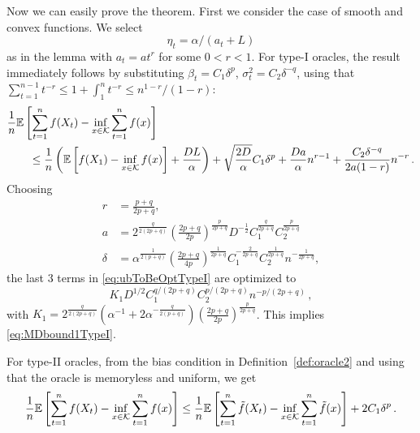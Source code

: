 Now we can easily prove the theorem.
First we consider the case of smooth and convex functions. We select $$\eta_t = \alpha/(a_t+L)$$ as in the lemma with 
$a_t=a t^r$ for some $0<r<1$. For type-I oracles, the result immediately follows by substituting $\beta_t = C_1\delta^p$, $\sigma^2_t = C_2 \delta^{-q}$, using that $\sum_{t=1}^{n-1} t^{-r} \le 1 +\int_1^n t^{-r} \le n^{1-r}/(1-r)$:
\begin{align}
\MoveEqLeft
\frac{1}{n} \EE{ \sum_{t=1}^n f( X_t) - \inf_{x \in \cK} \sum_{t=1}^n f(x)} \nonumber \\
&\le \frac{1}{n}\left(\EE{f(X_1)-\inf_{x \in \cK}f(x)}+\frac{DL}{\alpha}  \right) +\sqrt{\dfrac{2D}{\alpha}} C_1\delta^p
+\frac{Da}{\alpha} n^{r-1}+\dfrac{C_2 \delta^{-q}}{2a(1-r)}n^{-r} \,.
\label{eq:ubToBeOptTypeI}
 \end{align}
 Choosing 
 \begin{align*}
 r &= \tfrac{p+q}{2p+q},  \\
 a &= 2^{\frac{q}{2(2p+q)}}\left(\tfrac{2p+q}{2p}\right)^{\frac{p}{2p+q}} D^{-\frac{1}{2}} C_1^{\frac{q}{2p+q}} C_2^{\frac{p}{2p+q}} \\
 \delta &= \alpha^{\frac{1}{2(p+q)}}\left(\tfrac{2p+q}{4p}\right)^{\frac{1}{2p+q}} C_1^{-\frac{2}{2p+q}} C_2^{\frac{1}{2p+q}}n^{-\frac{1}{2p+q}},
 \end{align*}
the last $3$ terms in \eqref{eq:ubToBeOptTypeI} are optimized to
 \[
 K_1 D^{1/2} C_1^{q/(2p+q)} C_2^{p/(2p+q)} n ^{-p/(2p+q)} \,,
 \]
 with
 $K_1 = 2^{\frac{q}{2(2p+q)}} \left( \alpha^{-1}+2\alpha^{-\frac{q}{2(p+q)}} \right) \left( \frac{2p+q}{2p} \right)^{\frac{p}{2p+q}}$. This implies \eqref{eq:MDbound1TypeI}.

For type-II oracles, from the bias condition in Definition~\ref{def:oracle2} and using that the oracle is memoryless and uniform, we get
\begin{align*}
 \frac{1}{n} \mathbb{E}\left[ \sum_{t=1}^n f(X_t) - \inf_{x \in \mathcal{K}}\sum_{t=1}^n f(x) \right]
 \le \frac{1}{n}\mathbb{E}\left[ \sum_{t=1}^n \tilde{f}(X_t) - \inf_{x \in \mathcal{K}}\sum_{t=1}^n \tilde{f}(x) \right] +2C_1 \delta^p
 \,.
\end{align*}

